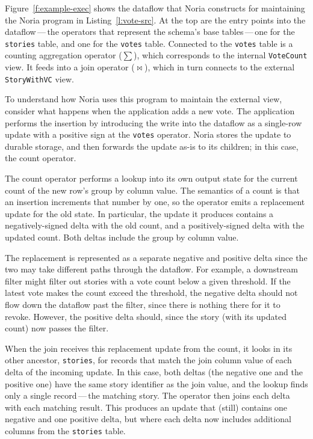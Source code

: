 Figure~\vref{f:example-exec} shows the dataflow that Noria constructs for
maintaining the Noria program in Listing~\vref{l:vote-src}. At the top are the
entry points into the dataflow\,---\,the operators that represent the schema's
base tables\,---\,one for the \texttt{stories} table, and one for the
\texttt{votes} table. Connected to the \texttt{votes} table is a counting
aggregation operator ($\sum$), which corresponds to the internal
\texttt{VoteCount} view. It feeds into a join operator ($\bowtie$), which in
turn connects to the external \texttt{StoryWithVC} view.

To understand how Noria uses this program to maintain the external view,
consider what happens when the application adds a new vote. The application
performs the insertion by introducing the write into the dataflow as a
single-row update with a positive sign at the \texttt{votes} operator. Noria
stores the update to durable storage, and then forwards the update as-is to its
children; in this case, the count operator.

The count operator performs a lookup into its own output state for the current
count of the new row's group by column value. The semantics of a count is that
an insertion increments that number by one, so the operator emits a replacement
update for the old state. In particular, the update it produces contains a
negatively-signed delta with the old count, and a positively-signed delta with
the updated count. Both deltas include the group by column value.

The replacement is represented as a separate negative and positive delta since
the two may take different paths through the dataflow. For example, a downstream
filter might filter out stories with a vote count below a given threshold. If
the latest vote makes the count exceed the threshold, the negative delta should
not flow down the dataflow past the filter, since there is nothing there for it
to revoke. However, the positive delta should, since the story (with its updated
count) now passes the filter.

When the join receives this replacement update from the count, it looks in its
other ancestor, \texttt{stories}, for records that match the join column value
of each delta of the incoming update. In this case, both deltas (the negative
one and the positive one) have the same story identifier as the join value, and
the lookup finds only a single record\,---\,the matching story. The operator
then joins each delta with each matching result. This produces an update that
(still) contains one negative and one positive delta, but where each delta now
includes additional columns from the \texttt{stories} table.

